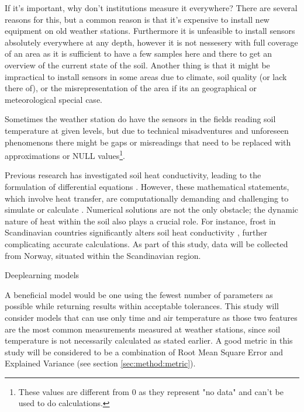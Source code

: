 If it's important, why don't institutions measure it everywhere? There are several reasons for this, but a common reason is that it's expensive to install new equipment on old weather stations. Furthermore it is unfeasible to install sensors absolutely everywhere at any depth, however it is not nessesery with full coverage of an area as it is sufficient to have a few samples here and there to get an overview of the current state of the soil. Another thing is that it might be impractical to install sensors in some areas due to climate, soil quality (or lack there of), or the misrepresentation of the area if its an geographical or meteorological special case.

Sometimes the weather station do have the sensors in the fields reading soil temperature at given levels, but due to technical misadventures and unforeseen phenomenons there might be gaps or misreadings that need to be replaced with approximations or NULL values\footnote{These values are different from 0 as they represent "no data" and can't be used to do calculations.}. 

Previous research has investigated soil heat conductivity, leading to the formulation of differential equations \cite{karvonen_model_1988}. However, these mathematical statements, which involve heat transfer, are computationally demanding and challenging to simulate or calculate \cite{fourier_analytical_2009, karvonen_model_1988}. Numerical solutions are not the only obstacle; the dynamic nature of heat within the soil also plays a crucial role. For instance, frost in Scandinavian countries significantly alters soil heat conductivity \cite{stuurop_influence_2022}, further complicating accurate calculations. As part of this study, data will be collected from Norway, situated within the Scandinavian region.

Deeplearning models

A beneficial model would be one using the fewest number of parameters as possible while returning results within acceptable tolerances. This study will consider models that can use only time and air temperature as those two features are the most common measurements measured at weather stations, since soil temperature is not necessarily calculated as stated earlier. A good metric in this study will be considered to be a combination of Root Mean Square Error and Explained Variance (see section \ref{sec:method:metric}). 

